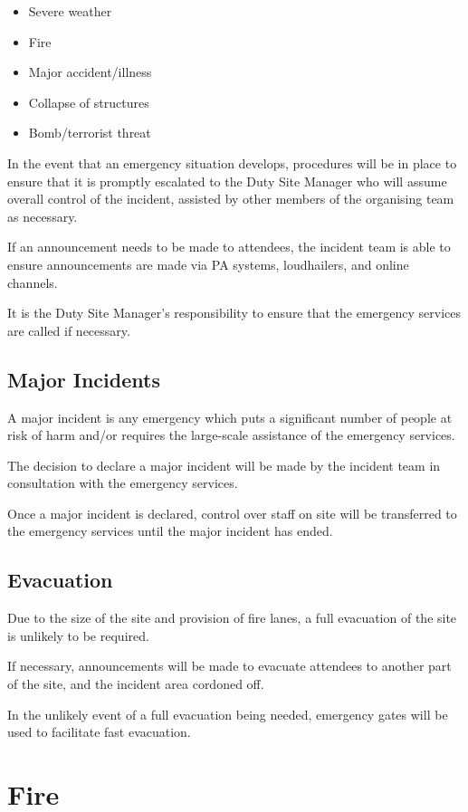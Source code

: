 \begin{itemize}
  \item Severe weather
  \item Fire
  \item Major accident/illness
  \item Collapse of structures
  \item Bomb/terrorist threat
\end{itemize}

In the event that an emergency situation develops, procedures will be in place
to ensure that it is promptly escalated to the Duty Site Manager who will assume
overall control of the incident, assisted by other members of the organising
team as necessary.

If an announcement needs to be made to attendees, the incident team is able to
ensure announcements are made via PA systems, loudhailers, and online channels.

It is the Duty Site Manager's responsibility to ensure that the emergency services
are called if necessary.

\subsection{Major Incidents}
A major incident is any emergency which puts a significant number of people at risk
of harm and/or requires the large-scale assistance of the emergency services.

The decision to declare a major incident will be made by the incident team in
consultation with the emergency services.

Once a major incident is declared, control over staff on site will be transferred
to the emergency services until the major incident has ended.

\subsection{Evacuation}
Due to the size of the site and provision of fire lanes, a full evacuation of the site
is unlikely to be required.

If necessary, announcements will be made to evacuate attendees to another part of the
site, and the incident area cordoned off.

In the unlikely event of a full evacuation being needed, emergency gates will be used
to facilitate fast evacuation.

\section{Fire}
\label{fire}
